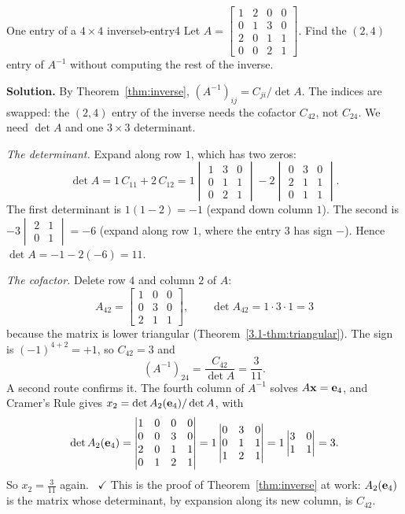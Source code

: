 \documentclass[11pt]{article}
\begin{document}
\begin{exmp}{One entry of a $4\times4$ inverse}{b-entry4}
Let $A=\begin{bmatrix}1&2&0&0\\0&1&3&0\\2&0&1&1\\0&0&2&1\end{bmatrix}$. Find the $(2,4)$ entry of $A^{-1}$ without computing the rest of the inverse.

\textbf{Solution.} By Theorem~\ref{thm:inverse}, $(A^{-1})_{ij}=C_{ji}/\det A$. The indices are swapped: the $(2,4)$ entry of the inverse needs the cofactor $C_{42}$, not $C_{24}$. We need $\det A$ and one $3\times3$ determinant.

\emph{The determinant.} Expand along row $1$, which has two zeros:
\[
\det A=1\,C_{11}+2\,C_{12}=1\begin{vmatrix}1&3&0\\0&1&1\\0&2&1\end{vmatrix}-2\begin{vmatrix}0&3&0\\2&1&1\\0&1&1\end{vmatrix}.
\]
The first determinant is $1(1-2)=-1$ (expand down column $1$). The second is $-3\begin{vmatrix}2&1\\0&1\end{vmatrix}=-6$ (expand along row $1$, where the entry $3$ has sign $-$). Hence $\det A=-1-2(-6)=11$.

\emph{The cofactor.} Delete row $4$ and column $2$ of $A$:
\[
A_{42}=\begin{bmatrix}1&0&0\\0&3&0\\2&1&1\end{bmatrix},\qquad\det A_{42}=1\cdot3\cdot1=3
\]
because the matrix is lower triangular (Theorem~\ref{3.1-thm:triangular}). The sign is $(-1)^{4+2}=+1$, so $C_{42}=3$ and
\[
(A^{-1})_{24}=\frac{C_{42}}{\det A}=\frac3{11}.
\]
A second route confirms it. The fourth column of $A^{-1}$ solves $A\mathbf{x}=\mathbf{e}_4$, and Cramer's Rule gives $x_2=\det A_2(\mathbf{e}_4)/\det A$, with
\[
\det A_2(\mathbf{e}_4)=\begin{vmatrix}1&0&0&0\\0&0&3&0\\2&0&1&1\\0&1&2&1\end{vmatrix}=1\begin{vmatrix}0&3&0\\0&1&1\\1&2&1\end{vmatrix}=1\begin{vmatrix}3&0\\1&1\end{vmatrix}=3.
\]
So $x_2=\frac3{11}$ again. \ $\checkmark$ This is the proof of Theorem~\ref{thm:inverse} at work: $A_2(\mathbf{e}_4)$ is the matrix whose determinant, by expansion along its new column, is $C_{42}$.
\end{exmp}
\end{document}
